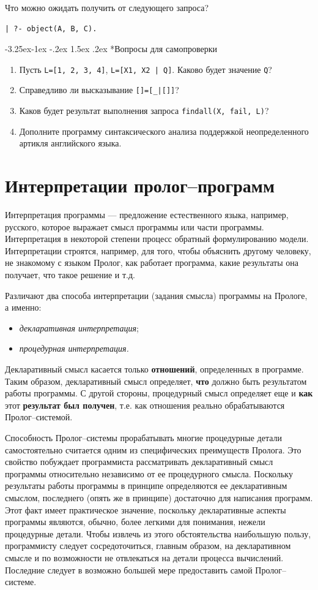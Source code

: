 \documentclass[12pt, openany, twoside]{book} %
\makeatletter
\renewcommand\subsubsection{\@startsection{subsubsection}{3}{\z@}%
                                     {-3.25ex\@plus -1ex \@minus -.2ex}%
                                     {1.5ex \@plus .2ex}%
                                     {\normalfont\normalsize\bfseries}}
\newenvironment{questions}{\subsubsection*{Вопросы для самопроверки}\begin{enumerate}}{\end{enumerate}}
\makeatother
\begin{document}
Что можно ожидать получить от следующего запроса?
{\tt\begin{verbatim}
| ?- object(А, В, С).
\end{verbatim}}
\begin{questions}
\item{} Пусть \texttt{L=[1, 2, 3, 4]}, \texttt{L=[X1, X2 | Q]}. Каково будет значение \texttt{Q}?
\item{} Справедливо ли высказывание \texttt{[]=[\_|[]]}?
\item{} Каков будет результат выполнения запроса \texttt{findall(X, fail, L)}?
\item{} Дополните программу синтаксического анализа поддержкой не\-опре\-де\-лен\-но\-го артикля английского языка.
\end{questions}

\chapter{Интерпретации пролог--программ}
Интерпретация программы --- предложение естественного языка, например, русского, которое выражает смысл программы или части программы. Интерпретация в некоторой степени процесс обратный формулированию модели. Интерпретации строятся, например, для того, чтобы объяснить другому человеку, не знакомому с языком Пролог, как работает программа, какие результаты она получает, что такое решение и т.д.

Различают два способа \cite{Bratko} интерпретации (задания смысла) программы на Прологе, а именно:
\begin{itemize}
\item \emph{декларативная интерпретация};
\item \emph{процедурная интерпретация.}
\end{itemize}


Декларативный смысл касается только \textbf{отношений}, определенных в программе. Таким образом, декларативный смысл определяет, {\bf что} должно быть результатом работы программы. С другой стороны, процедурный смысл определяет еще и {\bf как} этот {\bf результат был получен}, т.е. как отношения реально обрабатываются Пролог--системой.

Способность Пролог--системы прорабатывать многие процедурные детали самостоятельно считается одним из специфических преимуществ Пролога. Это свойство побуждает программиста рассматривать декларативный смысл программы относительно независимо от ее процедурного смысла. Поскольку результаты работы программы в принципе определяются ее декларативным смыслом, последнего (опять же в принципе) достаточно для написания программ. Этот факт имеет практическое значение, поскольку декларативные аспекты программы являются, обычно, более легкими для понимания, нежели процедурные детали. Чтобы извлечь из этого обстоятельства наибольшую пользу, программисту следует сосредоточиться, главным образом, на декларативном смысле и по возможности не отвлекаться на детали процесса вычислений. Последние следует в возможно большей мере предоставить самой Пролог--системе.
\end{document}
